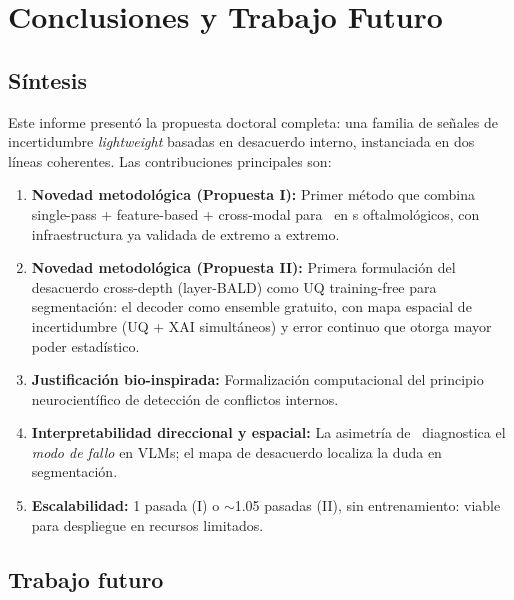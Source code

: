 \documentclass[12pt,a4paper]{article}
\newcommand{\KL}{\mathrm{KL}}
\newcommand{\UQ}{\text{UQ}}
\newcommand{\MedVLM}{\text{MedVLM}}
\begin{document}
\section{Conclusiones y Trabajo Futuro}

\subsection{Síntesis}

Este informe presentó la propuesta doctoral completa: una familia de señales de incertidumbre \textit{lightweight} basadas en desacuerdo interno, instanciada en dos líneas coherentes.
Las contribuciones principales son:

\begin{enumerate}
    \item \textbf{Novedad metodológica (Propuesta I):} Primer método que combina single-pass + feature-based + cross-modal para \UQ\ en \MedVLM s oftalmológicos, con infraestructura ya validada de extremo a extremo.

    \item \textbf{Novedad metodológica (Propuesta II):} Primera formulación del desacuerdo cross-depth (layer-BALD) como UQ training-free para segmentación: el decoder como ensemble gratuito, con mapa espacial de incertidumbre (UQ + XAI simultáneos) y error continuo que otorga mayor poder estadístico.

    \item \textbf{Justificación bio-inspirada:} Formalización computacional del principio neurocientífico de detección de conflictos internos.

    \item \textbf{Interpretabilidad direccional y espacial:} La asimetría de \KL\ diagnostica el \textit{modo de fallo} en VLMs; el mapa de desacuerdo localiza la duda en segmentación.

    \item \textbf{Escalabilidad:} 1 pasada (I) o $\sim$1.05 pasadas (II), sin entrenamiento: viable para despliegue en recursos limitados.
\end{enumerate}

\subsection{Trabajo futuro}
\end{document}
